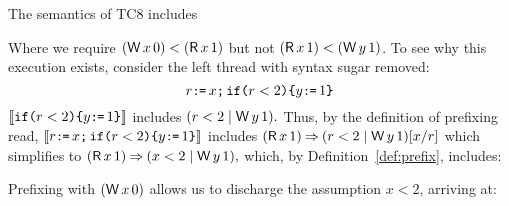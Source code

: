 The semantics of TC8 includes
\begin{tikzdisplay}[node distance=1em]
\end{tikzdisplay}
Where we require $(\DW{x}{0})\lt(\DR{x}{1})$ but not $(\DR{x}{1})\lt(\DW{y}{1})$.
To see why this execution exists, consider the left thread with syntax sugar
removed:
\begin{displaymath}
  r\texttt{:}\mkern-1mu\texttt{=}\, x\texttt{;}\,\allowbreak \texttt{if}\allowbreak\texttt{(}r<2\texttt{)}\allowbreak\texttt{\{} y\texttt{:}\mkern-1mu\texttt{=}\, 1\texttt{\}}
\end{displaymath}
\begin{math}
  \llbracket\texttt{if}\allowbreak\texttt{(}r<2\texttt{)}\allowbreak\texttt{\{} y\texttt{:}\mkern-1mu\texttt{=}\, 1\texttt{\}}\rrbracket
\end{math}
includes
\begin{math}
  (r<2\mid\DW{y}{1}).
\end{math}
Thus, by the definition of prefixing read,
\begin{math}
  \llbracket r\texttt{:}\mkern-1mu\texttt{=}\, x\texttt{;}\,\allowbreak \texttt{if}\allowbreak\texttt{(}r<2\texttt{)}\allowbreak\texttt{\{} y\texttt{:}\mkern-1mu\texttt{=}\, 1\texttt{\}}\rrbracket
\end{math}
includes
\begin{math}
  (\DR{x}{1}) \prefix (r<2\mid\DW{y}{1})[x/r]
\end{math}
which simplifies to
\begin{math}
  (\DR{x}{1}) \prefix (x<2\mid\DW{y}{1}),
\end{math}
which, by Definition~\ref{def:prefix}, includes:
\begin{tikzdisplay}[node distance=1em,baselinecenter]
  \end{tikzdisplay}

Prefixing with $(\DW{x}{0})$ allows us to discharge the assumption $x<2$,
arriving at:
\begin{tikzdisplay}[node distance=1em,baselinecenter]
  \end{tikzdisplay}

